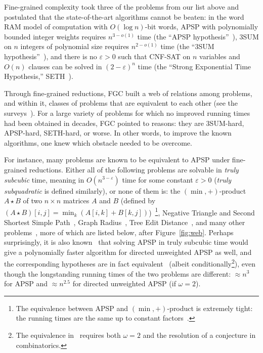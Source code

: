 Fine-grained complexity took three of the problems from our list above and postulated that the state-of-the-art algorithms cannot be beaten: in the word RAM model of computation with $O(\log n)$-bit words, APSP with polynomially bounded integer weights requires $n^{3-o(1)}$ time (the ``APSP hypothesis''~\cite{RZ04,VW10,VW18,AV14}), $3$SUM on $n$ integers of polynomial size requires $n^{2-o(1)}$ time (the ``$3$SUM hypothesis''~\cite{GO95,Pat10}), and there is no $\varepsilon>0$ such that CNF-SAT on $n$ variables and $O(n)$ clauses can be solved in $(2-\varepsilon)^n$ time (the ``Strong Exponential Time Hypothesis,'' SETH~\cite{IP01,IPZ01,CIP10}).

Through fine-grained reductions, FGC built a web of relations among problems, and within it, classes of problems that are equivalent to each other (see the surveys~\cite{Vas18,Bri19}). For a large variety of problems for which no improved running times had been obtained in decades, FGC pointed to reasons: they are 3SUM-hard, APSP-hard, SETH-hard, or worse. In other words, to improve the known algorithms, one knew which obstacle needed to be overcome.


For instance, many problems are known to be equivalent to APSP under fine-grained reductions. Either all of the following problems are solvable in \emph{truly subcubic} time, meaning in $O(n^{3-\varepsilon})$ time for some constant $\varepsilon>0$ (\emph{truly subquadratic} is defined similarly), or none of them is: the $(\min,+)$-product $A\star B$ of two $n\times n$ matrices $A$ and $B$ (defined by $(A\star B)[i,j]=\min_k(A[i,k]+B[k,j])$)~\cite{FM71,AHU74}\footnote{The equivalence between APSP and $(\min,+)$-product is extremely tight: the running times are the same up to constant factors~\cite{FM71,AHU74}.}, Negative Triangle and Second Shortest Simple Path~\cite{VW10,VW18}, Graph Radius~\cite{AGV15,AGV23}, Tree Edit Distance~\cite{BGMW20,NPSVXY25}, and many other problems~\cite{VW10,VW18,RV11,AGV15,AGV23}, more of which are listed below, after Figure~\ref{fig:web}. Perhaps surprisingly, it is also known~\cite{CVX21} that solving APSP in truly subcubic time would give a polynomially faster algorithm for directed unweighted APSP as well, and the corresponding hypotheses are in fact equivalent~\cite{Fis26} (albeit conditionally\footnote{The equivalence in~\cite{Fis26} requires both $\omega=2$ and the resolution of a conjecture in combinatorics.}), even though the longstanding running times of the two problems are different: $\approx n^3$ for APSP and $\approx n^{2.5}$ for directed unweighted APSP (if $\omega=2$).

